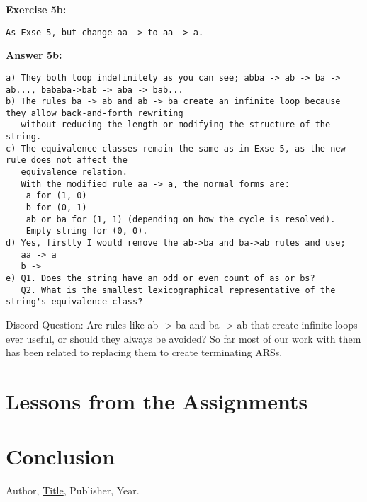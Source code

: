 \documentclass{article}
\theoremstyle{theorem}
\theoremstyle{definition}
\theoremstyle{remark}
\begin{document}
\textbf{Exercise 5b:}
\begin{verbatim}
As Exse 5, but change aa -> to aa -> a.
\end{verbatim}

\textbf{Answer 5b:}
\begin{verbatim}
a) They both loop indefinitely as you can see; abba -> ab -> ba -> ab..., bababa->bab -> aba -> bab...
b) The rules ba -> ab and ab -> ba create an infinite loop because they allow back-and-forth rewriting
   without reducing the length or modifying the structure of the string.
c) The equivalence classes remain the same as in Exse 5, as the new rule does not affect the 
   equivalence relation.
   With the modified rule aa -> a, the normal forms are:
    a for (1, 0)
    b for (0, 1)
    ab or ba for (1, 1) (depending on how the cycle is resolved).
    Empty string for (0, 0).
d) Yes, firstly I would remove the ab->ba and ba->ab rules and use;
   aa -> a
   b ->
e) Q1. Does the string have an odd or even count of as or bs?
   Q2. What is the smallest lexicographical representative of the string's equivalence class?
\end{verbatim}

Discord Question: Are rules like ab -> ba and ba -> ab that create infinite loops ever useful, or should they always be avoided? So far most of our work with them has been related to replacing them to create terminating ARSs.

\section{Lessons from the Assignments}


\section{Conclusion}\label{conclusion}


\begin{thebibliography}{99}
 Author, \href{https://en.wikipedia.org/wiki/LaTeX}{Title}, Publisher, Year.
\end{thebibliography}
\end{document}
